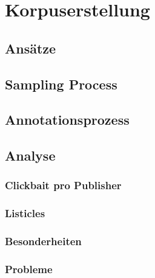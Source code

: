 \chapter{Korpuserstellung} 
\label{cha:korpus}
\section{Ansätze} %
\label{sec:ans_tze}

\section{Sampling Process} 
\label{sec:sampling_process}


\section{Annotationsprozess} 
\label{sec:annotationsprozess}


\section{Analyse} 
\label{sec:_berblick}

\subsection{Clickbait pro Publisher} 
\label{sub:clickbait_pro_publisher}


\subsection{Listicles} 
\label{sub:listicles}


\subsection{Besonderheiten} 
\label{sub:besonderheiten}


\subsection{Probleme} 
\label{sub:probleme}


